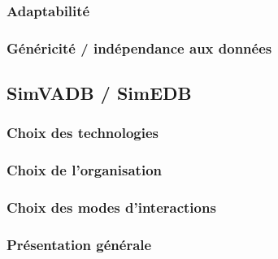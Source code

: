 		\subsubsection{Adaptabilité}
		\subsubsection{Généricité / indépendance aux données}

	\subsection{SimVADB / SimEDB}
		\subsubsection{Choix des technologies}
		\subsubsection{Choix de l'organisation}
		\subsubsection{Choix des modes d'interactions}
		\subsubsection{Présentation générale}

